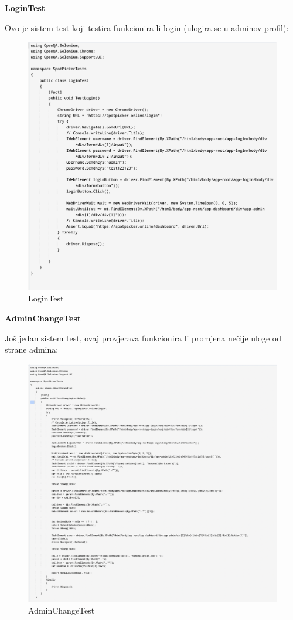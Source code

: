 			 \textbf{LoginTest}
			 
			 {Ovo je sistem test koji testira funkcionira li login (ulogira se u adminov profil):}
			 
			
			 
			
			 
			 \begin{figure}[hbt!]
			 	\centering
			 	\includegraphics[width=0.7\linewidth]{slike/kod4.png}
			 	\caption{LoginTest}
			 	\label{fig:kod4}
			 \end{figure}
			 
			 
			 \textbf{AdminChangeTest}
			 
			 {Još jedan sistem test, ovaj provjerava funkcionira li promjena nečije uloge od strane admina:}
			 
			 
			 
			 \begin{figure}[hbt!]
			 	\centering
			 	\includegraphics[width=0.7\linewidth]{slike/kod5.png}
			 	\caption{AdminChangeTest}
			 	\label{fig:kod5}
			 \end{figure}
			 
